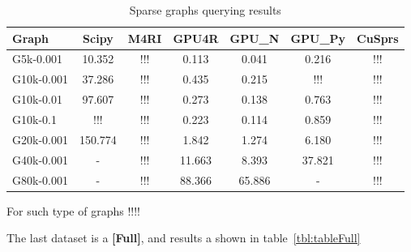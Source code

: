 \begin{table}[H]
\caption{Sparse graphs querying results}
\label{tbl:tableSparse}
\begin{tabular}{| l | c | c | c | c | c | c | }
    \hline
    Graph              & Scipy   & M4RI & GPU4R  & GPU\_N & GPU\_Py & CuSprs  \\
    \hline
    \hline
    \small{G5k-0.001}  & 10.352  & !!!  & 0.113  & 0.041  & 0.216   & !!!     \\
    \small{G10k-0.001} & 37.286  & !!!  & 0.435  & 0.215  & !!!     & !!!     \\
    \small{G10k-0.01}  & 97.607  & !!!  & 0.273  & 0.138  & 0.763   & !!!     \\
    \small{G10k-0.1}   & !!!     & !!!  & 0.223  & 0.114  & 0.859   & !!!     \\
    \small{G20k-0.001} & 150.774 & !!!  & 1.842  & 1.274  & 6.180   & !!!     \\
    \small{G40k-0.001} & -       & !!!  & 11.663 & 8.393  & 37.821  & !!!     \\
    \small{G80k-0.001} & -       & !!!  & 88.366 & 65.886 & -       & !!!     \\
    \hline
  \end{tabular}
\end{table}


For such type of graphs !!!!

The last dataset is a \textbf{[Full]}, and results a shown in table~\ref{tbl:tableFull}


